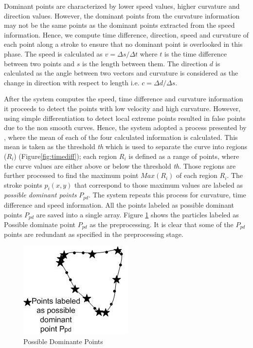 \documentclass{article}
\begin{document}
Dominant points are characterized by lower speed values, higher curvature and direction values. However, the dominant points from the curvature information may not be the same points as the dominant points extracted from the speed information. Hence, we compute time difference, direction, speed and curvature of each point along a stroke to ensure that no dominant point is overlooked in this phase. The speed is calculated as $v=\Delta s/\Delta t$ where $t$ is the time difference between two points and $s$ is the length between them. The direction $d$ is calculated as the angle between two vectors and curvature is considered as the change in direction with respect to length i.e. $c= \Delta d/\Delta s$. 
  
After the system computes the speed, time difference and curvature information it proceeds to detect the points with low velocity and high curvature. However, using simple differentiation to detect local extreme points resulted in false points due to the non smooth curves. Hence, the system adopted a process presented by \cite{earlyprocess}, where the mean of each of the four calculated information  is calculated. This mean is taken as the threshold \textit{th} which is used to separate the curve into regions ($R_i$) (Figure\ref{fig:timediff}); each region $R_i$ is defined as a range of points, where the curve values are either above or below the threshold \textit{th}. Those regions are further processed to find the maximum point $Max(R_i)$ of each region $R_i$. The stroke points $p_i(x,y)$ that correspond to those maximum values are labeled as \textit{possible dominant points} $P_{pd}$. The system repeats this process for curvature, time difference and speed information. All the points labeled as possible dominant points $P_{pd}$ are saved into a single array. Figure \ref{fig:ppd999} shows the particles labeled as Possible dominate point $P_{pd}$ as the preprocessing. It is clear that some of the $P_{pd}$ points are redundant as specified in the preprocessing stage. %
\begin{figure}
	\centering
\includegraphics[scale=0.7]{images/ppd.jpg}
	\caption{Possible Dominante Points}
	\label{fig:ppd999}	
\end{figure}
\end{document}
